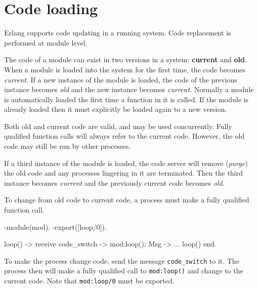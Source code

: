 \chapter{Code loading}
\label{code}

Erlang supports code updating in a running system. Code replacement is
performed at module level.

The code of a module can exist in two versions in a system:
\textbf{current} and \textbf{old}. When a module is
loaded into the system for the first time, the code becomes
\emph{current}. If a new instance of the module is loaded, the code
of the previous instance becomes \emph{old} and the new instance
becomes \emph{current}. Normally a module is automatically loaded
the first time a function in it is called. If the module is already
loaded then it must explicitly be loaded again to a new version.

Both old and current code are valid, and may be used
concurrently. Fully qualified function calls will always refer to the
current code. However, the old code may still be run by other
processes.

If a third instance of the module is loaded, the code server will
remove (\emph{purge}) the old code and any processes lingering in it
are terminated. Then the third instance becomes \emph{current} and
the previously current code becomes \emph{old}.

To change from old code to current code, a process must make a fully
qualified function call.

\begin{erlang}
-module(mod).
-export([loop/0]).

loop() ->
    receive
        code_switch ->
            mod:loop();
        Msg ->
            ...
            loop()
    end.
\end{erlang}

To make the process change code, send the message
\texttt{code\_switch} to it. The process then will make a fully
qualified call to \texttt{mod:loop()} and change to the current
code. Note that \texttt{mod:loop/0} must be exported.